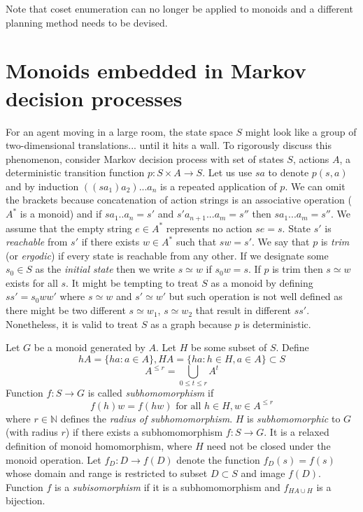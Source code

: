 \documentclass[oneside,english,logo]{amuthesis}
\begin{document}
Note that coset enumeration can no longer be applied to monoids and a different planning method needs to be devised.

\section{Monoids embedded in Markov decision processes}
\label{subsection:group_manifolds}
For an agent moving in a large room, the state space $S$ might look like a group of two-dimensional translations... until it hits a wall. To rigorously discuss this phenomenon, consider Markov decision process with set of states $S$, actions $A$, a deterministic transition function $p:S\times A \rightarrow S$. Let us use $sa$ to denote $p(s,a)$ and by induction $((sa_1)a_2)...a_n$ is a repeated application of $p$. We can omit the brackets because concatenation of action strings is an associative operation ($A^*$ is a monoid) and if $sa_1..a_n=s'$ and $s'a_{n+1}...a_{m}=s''$ then $sa_1...a_m=s''$. We assume that the empty string $e\in A^*$ represents no action $se=s$. State $s'$ is \textit{reachable} from $s'$ if there exists $w\in A^*$ such that $sw=s'$. We say that $p$ is \textit{trim} (or \textit{ergodic}) if every state is reachable from any other. If we designate some $s_0\in S$ as the \textit{initial state} then we write $s \simeq w$ if $s_0w=s$. If $p$ is trim then $s \simeq w$ exists for all $s$.
It might be tempting to treat $S$ as a monoid by defining $ss'=s_0ww'$ where $s\simeq w$ and $s'\simeq w'$ but such operation is not well defined as there might be two different $s\simeq w_1$, $s\simeq w_2$ that result in different $ss'$. Nonetheless, it is valid to treat $S$ as a graph because $p$ is deterministic.

Let $G$ be a monoid generated by $A$. Let $H$ be some subset of $S$. Define 
\[
hA=\{ha:a\in A\},HA=\{ha:h\in H, a\in A\}\subset S
\]
\[
A^{\le r}=\bigcup_{0 \le t \le r} A^t 
\]
Function $f:S \rightarrow G$ is called \textit{subhomomorphism} if 
\[
f(h)w=f(hw)\text{ for all }h\in H, w\in A^{\le r}
\]
where $r\in \mathbb{N}$ defines the \textit{radius of subhomomorphism}.
$H$ is \textit{subhomomorphic} to $G$ (with radius $r$) if there exists a subhomomorphism $f:S \rightarrow G$. It is a relaxed definition of monoid homomorphism, where $H$ need not be closed under the monoid operation. Let $f_D:D\rightarrow f(D)$ denote the function $f_D(s)=f(s)$ whose domain and range is restricted to subset $D\subset S$ and image $f(D)$. 
Function $f$ is a \textit{subisomorphism} if it is a subhomomorphism and $f_{HA \cup H}$ is a bijection. 
\end{document}
